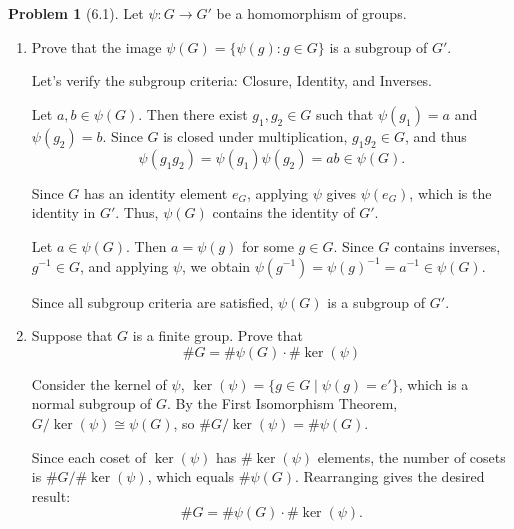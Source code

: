 \documentclass[12pt]{article}
\theoremstyle{definition}
\newtheorem{problem}{Problem}
\begin{document}
\begin{problem}[6.1]
    Let $\psi : G \longrightarrow G'$ be a homomorphism of groups.
    \begin{enumerate}[label=(\alph*)]
        \item Prove that the image $\psi(G) = \{ \psi(g) : g \in G \}$ is a subgroup of $G'$.
        
        \begin{solution}
            Let's verify the subgroup criteria: Closure, Identity, and Inverses.
            
            Let $a, b \in \psi(G)$. Then there exist $g_1, g_2 \in G$ such that $\psi(g_1) = a$ and $\psi(g_2) = b$. Since $G$ is closed under multiplication, $g_1 g_2 \in G$, and thus
               \[
               \psi(g_1 g_2) = \psi(g_1) \psi(g_2) = ab \in \psi(G).
               \]
            
            Since $G$ has an identity element $e_G$, applying $\psi$ gives $\psi(e_G)$, which is the identity in $G'$. Thus, $\psi(G)$ contains the identity of $G'$.
            
            Let $a \in \psi(G)$. Then $a = \psi(g)$ for some $g \in G$. Since $G$ contains inverses, $g^{-1} \in G$, and applying $\psi$, we obtain $\psi(g^{-1}) = \psi(g)^{-1} = a^{-1} \in \psi(G)$.
            
            Since all subgroup criteria are satisfied, $\psi(G)$ is a subgroup of $G'$.
        \end{solution}

        \item Suppose that $G$ is a finite group. Prove that
              \[
                  \#G = \#\psi(G) \cdot \#\ker(\psi)
              \]

        \begin{solution}
            Consider the kernel of $\psi$, $\ker(\psi) = \{ g \in G \mid \psi(g) = e' \}$, which is a normal subgroup of $G$. By the First Isomorphism Theorem, $G/\ker(\psi) \cong \psi(G)$, so $\#G/\ker(\psi) = \#\psi(G)$.
            
            Since each coset of $\ker(\psi)$ has $\#\ker(\psi)$ elements, the number of cosets is $\#G / \#\ker(\psi)$, which equals $\#\psi(G)$. Rearranging gives the desired result:
            \[
            \#G = \#\psi(G) \cdot \#\ker(\psi).
            \]
        \end{solution}
    \end{enumerate}
\end{problem}
\end{document}
